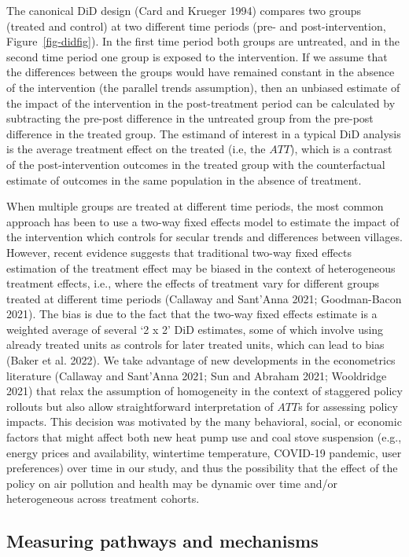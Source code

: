\documentclass[
  letterpaper,
  DIV=11,
  numbers=noendperiod]{scrartcl}
\begin{document}
The canonical DiD design (Card and Krueger 1994) compares two groups
(treated and control) at two different time periods (pre- and
post-intervention, Figure~\ref{fig-didfig}). In the first time period
both groups are untreated, and in the second time period one group is
exposed to the intervention. If we assume that the differences between
the groups would have remained constant in the absence of the
intervention (the parallel trends assumption), then an unbiased estimate
of the impact of the intervention in the post-treatment period can be
calculated by subtracting the pre-post difference in the untreated group
from the pre-post difference in the treated group. The estimand of
interest in a typical DiD analysis is the average treatment effect on
the treated (i.e, the \(ATT\)), which is a contrast of the
post-intervention outcomes in the treated group with the counterfactual
estimate of outcomes in the same population in the absence of treatment.

When multiple groups are treated at different time periods, the most
common approach has been to use a two-way fixed effects model to
estimate the impact of the intervention which controls for secular
trends and differences between villages. However, recent evidence
suggests that traditional two-way fixed effects estimation of the
treatment effect may be biased in the context of heterogeneous treatment
effects, i.e., where the effects of treatment vary for different groups
treated at different time periods (Callaway and Sant'Anna 2021;
Goodman-Bacon 2021). The bias is due to the fact that the two-way fixed
effects estimate is a weighted average of several `2 x 2' DiD estimates,
some of which involve using already treated units as controls for later
treated units, which can lead to bias (Baker et al. 2022). We take
advantage of new developments in the econometrics literature (Callaway
and Sant'Anna 2021; Sun and Abraham 2021; Wooldridge 2021) that relax
the assumption of homogeneity in the context of staggered policy
rollouts but also allow straightforward interpretation of \(ATT\)s for
assessing policy impacts. This decision was motivated by the many
behavioral, social, or economic factors that might affect both new heat
pump use and coal stove suspension (e.g., energy prices and
availability, wintertime temperature, COVID-19 pandemic, user
preferences) over time in our study, and thus the possibility that the
effect of the policy on air pollution and health may be dynamic over
time and/or heterogeneous across treatment cohorts.

\subsection{Measuring pathways and
mechanisms}\label{measuring-pathways-and-mechanisms}
\end{document}
